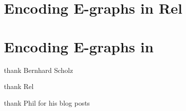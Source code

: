 \section{Encoding E-graphs in Rel}\label{section/rel}

\section{Encoding E-graphs in }

thank Bernhard Scholz

thank Rel

thank Phil for his blog posts